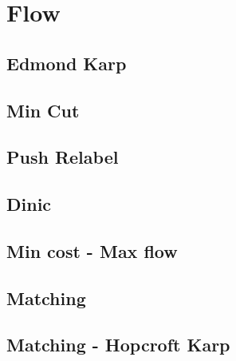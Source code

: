 \newpage
\section{Flow}
\subsection{Edmond Karp}

\newpage
\subsection{Min Cut}

\subsection{Push Relabel}

\newpage
\subsection{Dinic}

\subsection{Min cost - Max flow}


\subsection{Matching}


\subsection{Matching - Hopcroft Karp}
